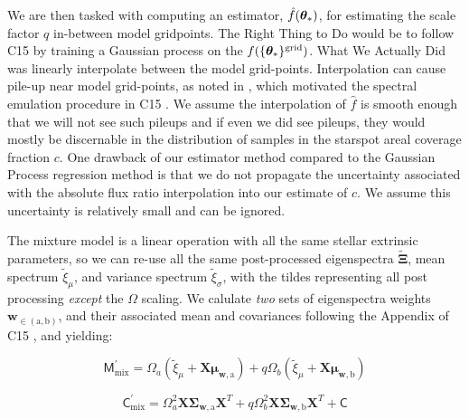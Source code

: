 \documentclass[onecolumn]{emulateapj}%
\newcommand{\iancze}{{\sc C15 }}
\begin{document}
We are then tasked with computing an estimator, $\hat f({\bm \theta}_{\ast})$, for estimating the scale factor $q$ in-between model gridpoints.  The Right Thing to Do would be to follow \iancze by training a Gaussian process on the $f(\{{\bm \theta}_{\ast}\}^\textrm{grid})$.  What We Actually Did was linearly interpolate between the model grid-points.  Interpolation can cause pile-up near model grid-points, as noted in \citet{2014ApJ...794..125C}, which motivated the spectral emulation procedure in \iancze.  We assume the interpolation of $\hat f$ is smooth enough that we will not see such pileups and if even we did see pileups, they would mostly be discernable in the distribution of samples in the starspot areal coverage fraction $c$.  One drawback of our estimator method compared to the Gaussian Process regression method is that we do not propagate the uncertainty associated with the absolute flux ratio interpolation into our estimate of $c$.  We assume this uncertainty is relatively small and can be ignored.

The mixture model is a linear operation with all the same stellar extrinsic parameters, so we can re-use all the same post-processed eigenspectra $\widetilde{\mathbf{\Xi}}$, mean spectrum $\widetilde{\xi}_\mu$, and variance spectrum $\widetilde{\xi}_\sigma$, with the tildes representing all post processing \emph{except} the $\Omega$ scaling.  We calulate \emph{two} sets of eigenspectra weights $\mathbf{w}_{\in (\mathrm{a}, \mathrm{b})}$, and their associated mean and covariances following the Appendix of \iancze, and yielding:

\begin{equation}
  \mathsf{M}_{\mathrm{mix}}^\prime = \Omega_a (\widetilde{\xi}_\mu + \mathbf{X} \mathbf{\mu}_{\mathbf{w}, \mathrm{a}}) + q \Omega_b (\widetilde{\xi}_\mu + \mathbf{X} \mathbf{\mu}_{\mathbf{w}, \mathrm{b}})
\end{equation}

\begin{equation}
  \mathsf{C}_{\mathrm{mix}}^\prime = \Omega_a^2 \mathbf{X} \mathbf{\Sigma}_\mathbf{w, \mathrm{a}} \mathbf{X}^T + q \Omega_b^2 \mathbf{X} \mathbf{\Sigma}_\mathbf{w, \mathrm{b}} \mathbf{X}^T + \mathsf{C}
  \label{eqn:modC}
\end{equation}
\end{document}
